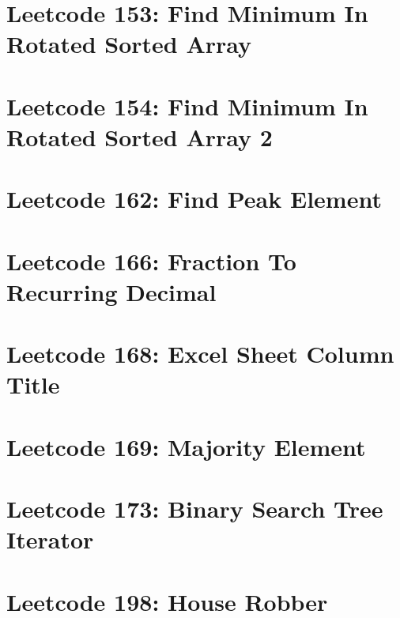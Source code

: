 \documentclass{article}
\begin{document}
\section*{Leetcode 153: Find Minimum In Rotated Sorted Array}

\pagebreak 

\section*{Leetcode 154: Find Minimum In Rotated Sorted Array 2}

\pagebreak 

\section*{Leetcode 162: Find Peak Element}

\pagebreak 

\section*{Leetcode 166: Fraction To Recurring Decimal}

\pagebreak 

\section*{Leetcode 168: Excel Sheet Column Title}

\pagebreak 

\section*{Leetcode 169: Majority Element}

\pagebreak 

\section*{Leetcode 173: Binary Search Tree Iterator}

\pagebreak 

\section*{Leetcode 198: House Robber}

\pagebreak 
\end{document}
